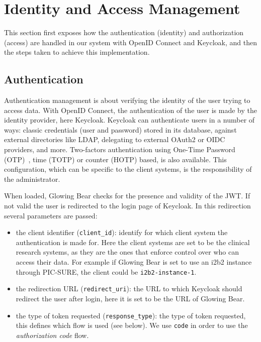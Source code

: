 \section{Identity and Access Management}
\label{sec:interoplayer-idp}

This section first exposes how the authentication (identity) and authorization (access) are handled in our system with OpenID Connect and Keycloak, and then the steps taken to achieve this implementation.



\subsection{Authentication}

Authentication management is about verifying the identity of the user trying to access data.
With OpenID Connect, the authentication of the user is made by the identity provider, here Keycloak.
Keycloak can authenticate users in a number of ways: classic credentials (user and password) stored in its database, against external directories like LDAP, delegating to external OAuth2 or OIDC providers, and more.
Two-factors authentication using One-Time Password (OTP)~\cite{rayes2011one}, time (TOTP) or counter (HOTP) based, is also available.
This configuration, which can be specific to the client systems, is the responsibility of the administrator. 

When loaded, Glowing Bear checks for the presence and validity of the JWT. 
If not valid the user is redirected to the login page of Keycloak. 
In this redirection several parameters are passed:

\begin{itemize}
    \item the client identifier (\verb|client_id|): identify for which client system the authentication is made for.
    Here the client systems are set to be the clinical research systems, as they are the ones that enforce control over who can access their data. For example if Glowing Bear is set to use an i2b2 instance through PIC-SURE, the client could be \verb|i2b2-instance-1|.
    \item the redirection URL (\verb|redirect_uri|): the URL to which Keycloak should redirect the user after login, here it is set to be the URL of Glowing Bear.
    \item the type of token requested (\verb|response_type|): the type of token requested, this defines which flow is used (see below). We use \verb|code| in order to use the \emph{authorization code} flow.
\end{itemize}

